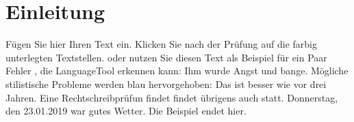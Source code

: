 
\section{Einleitung}

Fügen Sie hier Ihren Text ein. Klicken Sie nach der Prüfung auf die farbig unterlegten Textstellen. oder nutzen Sie diesen Text als Beispiel für ein Paar Fehler , die LanguageTool erkennen kann: Ihm wurde Angst und bange. Mögliche stilistische Probleme werden blau hervorgehoben: Das ist besser wie vor drei Jahren. Eine Rechtschreibprüfun findet findet übrigens auch statt. Donnerstag, den 23.01.2019 war gutes Wetter. Die Beispiel endet hier.
